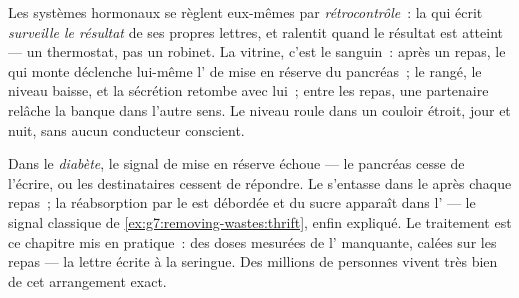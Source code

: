 \begin{proposition}\label{prop:g8:hormonal-communication:feedback}
Les systèmes hormonaux se règlent eux-mêmes par
\emph{rétrocontrôle}~: la  qui
écrit \emph{surveille le résultat} de ses propres lettres,
et ralentit quand le résultat est atteint --- un thermostat,
pas un robinet. La vitrine, c'est le  sanguin~: après
un repas, le  qui monte déclenche lui-même l'
de mise en réserve du pancréas~; le  rangé, le
niveau baisse, et la sécrétion retombe avec lui~; entre les
repas, une  partenaire relâche la banque dans
l'autre sens. Le niveau roule dans un couloir étroit, jour
et nuit, sans aucun conducteur conscient.
\end{proposition}
\admitted

\begin{example}\label{ex:g8:hormonal-communication:diabetes}
Dans le \emph{diabète}, le signal de mise en
réserve échoue --- le pancréas cesse de l'écrire, ou les
destinataires cessent de répondre. Le  s'entasse
dans le  après chaque repas~; la réabsorption par le
 est débordée et du sucre apparaît dans l' ---
le signal classique de
\cref{ex:g7:removing-wastes:thrift}, enfin expliqué. Le
traitement est ce chapitre mis en pratique~: des doses
mesurées de l' manquante, calées sur les repas ---
la lettre écrite à la seringue. Des millions de personnes
vivent très bien de cet arrangement exact.
\end{example}

